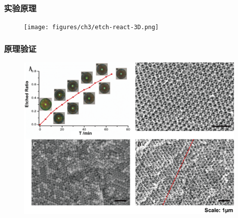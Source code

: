 \documentclass{beamer}
\begin{document}
\begin{frame}
  \frametitle{实验原理}
  \begin{figure}[htbp]
    \begin{center}
      \texttt{[image: figures/ch3/etch-react-3D.png]}
    \end{center}
  \end{figure}
\end{frame}




\begin{frame}
  \frametitle{原理验证}
  \begin{figure}
    \begin{center}
      \includegraphics[width=0.85\linewidth]{figures/ch3/Etch-chara.png}
    \end{center}
  \end{figure}
\end{frame}
\end{document}
